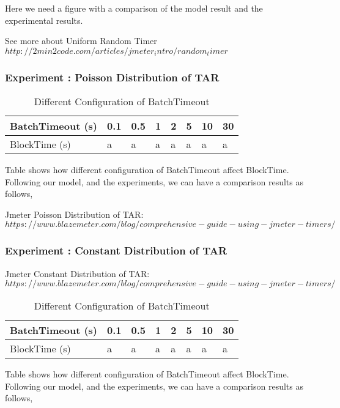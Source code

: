 \documentclass[10pt,journal,compsoc, twoside]{IEEEtran}
\begin{document}
Here we need a figure with a comparison of the model result and the experimental results.


See more about Uniform Random Timer $http://2min2code.com/articles/jmeter_intro/random_timer$





\subsubsection{Experiment : Poisson Distribution of TAR}

\begin{table}[htbp]
	\caption{Different Configuration of BatchTimeout}
	\begin{tabular}{|l|l|l|l|l|l|l|l|}
		\hline
		BatchTimeout (s) & 0.1 & 0.5 & 1 & 2 & 5 & 10 & 30 \\ \hline
		BlockTime (s)    & a   & a   & a & a & a & a  & a  \\ \hline
	\end{tabular}
\end{table}

Table shows how different configuration of BatchTimeout affect BlockTime. Following our model, and the experiments, we can have a comparison results as follows,

Jmeter Poisson Distribution of TAR: $https://www.blazemeter.com/blog/comprehensive-guide-using-jmeter-timers/$




\subsubsection{Experiment : Constant Distribution of TAR}

Jmeter Constant Distribution of TAR: $https://www.blazemeter.com/blog/comprehensive-guide-using-jmeter-timers/$

\begin{table}[htbp]
	\caption{Different Configuration of BatchTimeout}
	\begin{tabular}{|l|l|l|l|l|l|l|l|}
		\hline
		BatchTimeout (s) & 0.1 & 0.5 & 1 & 2 & 5 & 10 & 30 \\ \hline
		BlockTime (s)    & a   & a   & a & a & a & a  & a  \\ \hline
	\end{tabular}
\end{table}

Table shows how different configuration of BatchTimeout affect BlockTime. Following our model, and the experiments, we can have a comparison results as follows,
\end{document}
